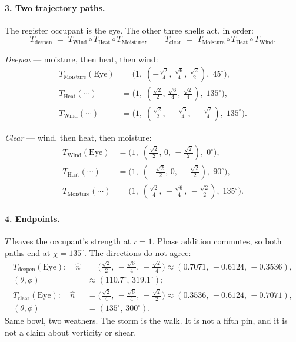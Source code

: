 \documentclass[12pt, a4paper]{article}
\begin{document}
\paragraph{3. Two trajectory paths.}
The register occupant is the eye. The other three shells act, in order:
\begin{equation}
    T_{\mathrm{deepen}}
    \;=\;
    T_{\mathrm{Wind}}\circ T_{\mathrm{Heat}}\circ T_{\mathrm{Moisture}},
    \qquad
    T_{\mathrm{clear}}
    \;=\;
    T_{\mathrm{Moisture}}\circ T_{\mathrm{Heat}}\circ T_{\mathrm{Wind}}.
\end{equation}

\emph{Deepen} --- moisture, then heat, then wind:
\begin{align*}
T_{\mathrm{Moisture}}(\mathrm{Eye})
&= \bigl(1,\;(-\tfrac{\sqrt{2}}{4},\,\tfrac{\sqrt{6}}{4},\,\tfrac{\sqrt{2}}{2}),\;45^\circ\bigr),\\
T_{\mathrm{Heat}}(\cdots)
&= \bigl(1,\;(\tfrac{\sqrt{2}}{2},\,\tfrac{\sqrt{6}}{4},\,\tfrac{\sqrt{2}}{4}),\;135^\circ\bigr),\\
T_{\mathrm{Wind}}(\cdots)
&= \bigl(1,\;(\tfrac{\sqrt{2}}{2},\,-\tfrac{\sqrt{6}}{4},\,-\tfrac{\sqrt{2}}{4}),\;135^\circ\bigr).
\end{align*}

\emph{Clear} --- wind, then heat, then moisture:
\begin{align*}
T_{\mathrm{Wind}}(\mathrm{Eye})
&= \bigl(1,\;(\tfrac{\sqrt{2}}{2},\,0,\,-\tfrac{\sqrt{2}}{2}),\;0^\circ\bigr),\\
T_{\mathrm{Heat}}(\cdots)
&= \bigl(1,\;(-\tfrac{\sqrt{2}}{2},\,0,\,-\tfrac{\sqrt{2}}{2}),\;90^\circ\bigr),\\
T_{\mathrm{Moisture}}(\cdots)
&= \bigl(1,\;(\tfrac{\sqrt{2}}{4},\,-\tfrac{\sqrt{6}}{4},\,-\tfrac{\sqrt{2}}{2}),\;135^\circ\bigr).
\end{align*}

\paragraph{4. Endpoints.}
$T$ leaves the occupant's strength at $r=1$. Phase addition commutes, so
both paths end at $\chi=135^\circ$. The directions do not agree:
\begin{align*}
T_{\mathrm{deepen}}(\mathrm{Eye}):
\quad
\hat n
&= \bigl(\tfrac{\sqrt{2}}{2},\,-\tfrac{\sqrt{6}}{4},\,-\tfrac{\sqrt{2}}{4}\bigr)
\approx (0.7071,\,-0.6124,\,-0.3536),\\
(\theta,\phi)&\approx(110.7^\circ,\,319.1^\circ);\\[0.4em]
T_{\mathrm{clear}}(\mathrm{Eye}):
\quad
\hat n
&= \bigl(\tfrac{\sqrt{2}}{4},\,-\tfrac{\sqrt{6}}{4},\,-\tfrac{\sqrt{2}}{2}\bigr)
\approx (0.3536,\,-0.6124,\,-0.7071),\\
(\theta,\phi)&=(135^\circ,\,300^\circ).
\end{align*}
Same bowl, two weathers. The storm is the walk. It is not a fifth pin,
and it is not a claim about vorticity or shear.
\end{document}
